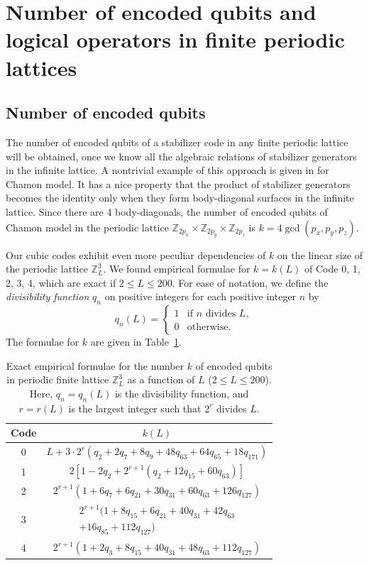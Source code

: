 \documentclass[letterpaper,10pt,pra,aps,showpacs,twocolumn]{revtex4-1}
\theoremstyle{definition} \newtheorem{defn}{Definition}
\theoremstyle{definition} \newtheorem{remark}{Remark}
\begin{document}
\section{Number of encoded qubits and logical operators in finite periodic lattices}
\label{section:k_vs_L}

\subsection{Number of encoded qubits}

The number of encoded qubits of a stabilizer code in any finite periodic lattice will be obtained, once we know all the algebraic relations of stabilizer generators in the infinite lattice. A nontrivial example of this approach is given in \cite{BravyiLeemhuisTerhal2010Topological} for Chamon model. It has a nice property that the product of stabilizer generators becomes the identity only when they form body-diagonal surfaces in the infinite lattice. Since there are 4 body-diagonals, the number of encoded qubits of Chamon model in the periodic lattice $\mathbb{Z}_{2 p_x} \times \mathbb{Z}_{2 p_y} \times \mathbb{Z}_{2 p_z}$ is $k = 4 \gcd(p_x,p_y,p_z)$.

Our cubic codes exhibit even more peculiar dependencies of $k$ on the linear size of the periodic lattice $\mathbb{Z}_L^3$. We found empirical formulae for $k=k(L)$ of Code 0, 1, 2, 3, 4, which are exact if $ 2 \leq L \leq 200 $. For ease of notation, we define the \emph{divisibility function} $q_n$ on positive integers for each positive integer $n$ by
\[
 q_n(L) =  
  \begin{cases}
   1 & \text{if $n$ divides $L$}, \\
   0 & \text{otherwise}.
  \end{cases}
\]
The formulae for $k$ are given in Table~\ref{tb:k_vs_L}.

\begin{table}
\centering
\begin{tabular}{c|c}
\hline
Code & $k(L)$ \\
\hline
0 & $L + 3 \cdot 2^r \left( q_2 + 2 q_7 + 8 q_9 + 48 q_{63} + 64 q_{65} + 18 q_{171} \right)$ \\
1 & $2 \left[ 1 - 2 q_2 + 2^{r+1} \left( q_2 + 12 q_{15} + 60 q_{63} \right) \right]$ \\
2 & $2^{r+1} \left( 1 + 6 q_7 + 6 q_{21} + 30 q_{31} + 60 q_{63} + 126 q_{127} \right)$ \\
3 & $\begin{matrix} 2^{r+1} ( 1 + 8 q_{15} + 6 q_{21} + 40 q_{31} + 42 q_{63} \\ + 16 q_{85} + 112 q_{127} )\end{matrix}$ \\
4 & $2^{r+1} \left( 1 + 2 q_3 + 8 q_{15} + 40 q_{31} + 48 q_{63} + 112 q_{127} \right)$ \\
\hline
\end{tabular}
\caption{Exact empirical formulae for the number $k$ of encoded qubits in periodic finite lattice $\mathbb{Z}_L^3$ as a function of $L$ ($2 \leq L \leq 200$). Here, $q_n=q_n(L)$ is the divisibility function, and $r=r(L)$ is the largest integer such that $2^r$ divides $L$.}
\label{tb:k_vs_L}
\end{table}
\end{document}
